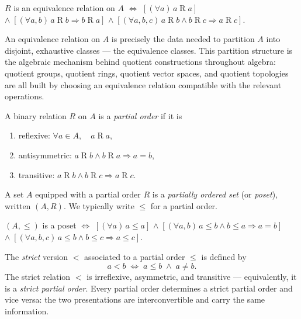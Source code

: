 \begin{remark}
$R$ is an equivalence relation on $A$
$\iff$
$[(\forall a)\, a \mathrel{R} a]$
$\land\;
[(\forall a,b)\, a \mathrel{R} b \Rightarrow b \mathrel{R} a]$
$\land\;
[(\forall a,b,c)\, a \mathrel{R} b \land b \mathrel{R} c \Rightarrow a \mathrel{R} c]$.
\end{remark}

\begin{remark}
An equivalence relation on $A$ is precisely the data needed to partition
$A$ into disjoint, exhaustive classes — the equivalence classes.
This partition structure is the algebraic mechanism behind
quotient constructions throughout algebra:
quotient groups, quotient rings, quotient vector spaces, and quotient topologies
are all built by choosing an equivalence relation compatible with the relevant
operations.
\end{remark}

\begin{tcolorbox}[colback=propbox, colframe=propborder, arc=2pt,
  left=6pt, right=6pt, top=4pt, bottom=4pt,
  title={\small\textbf{Definition (Partial Order)}},
  fonttitle=\small\bfseries]
\label{def:partial-order}
A binary relation $R$ on $A$ is a \emph{partial order} if it is
\begin{enumerate}[label=(\roman*)]
  \item reflexive: $\forall a \in A,\quad a \mathrel{R} a$,
  \item antisymmetric: $a \mathrel{R} b \land b \mathrel{R} a \Rightarrow a = b$,
  \item transitive: $a \mathrel{R} b \land b \mathrel{R} c \Rightarrow a \mathrel{R} c$.
\end{enumerate}
A set $A$ equipped with a partial order $R$ is a \emph{partially ordered set}
(or \emph{poset}), written $(A, R)$.
We typically write $\leq$ for a partial order.
\end{tcolorbox}

\begin{remark}
$(A, \leq)$ is a poset
$\iff$
$[(\forall a)\, a \leq a]$
$\land\; [(\forall a,b)\, a \leq b \land b \leq a \Rightarrow a = b]$
$\land\; [(\forall a,b,c)\, a \leq b \land b \leq c \Rightarrow a \leq c]$.
\end{remark}

\begin{remark}
\label{def:strict-partial-order}
The \emph{strict} version $<$ associated to a partial order $\leq$ is defined by
\[
  a < b \;\iff\; a \leq b \;\land\; a \neq b.
\]
The strict relation $<$ is irreflexive, asymmetric, and transitive —
equivalently, it is a \emph{strict partial order}.
Every partial order determines a strict partial order and vice versa:
the two presentations are interconvertible and carry the same information.
\end{remark}

